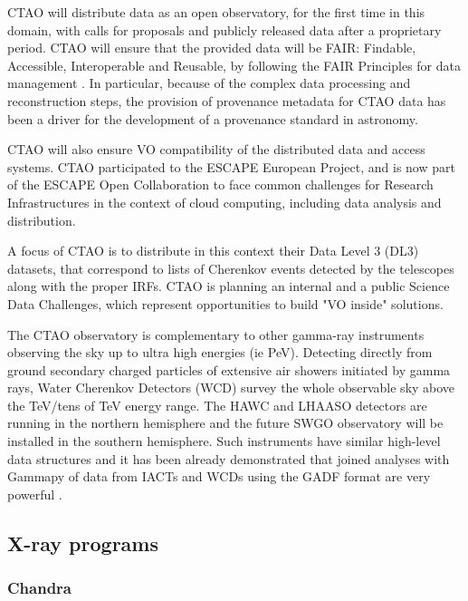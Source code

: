 \documentclass[11pt,a4paper]{ivoa}
\begin{document}
CTAO will distribute data as an open observatory, for the first time in this domain, with calls for proposals and
publicly released data after a proprietary period. CTAO will ensure that the provided data will be FAIR: Findable,
Accessible, Interoperable and Reusable, by following the FAIR Principles for data management \citep{Wilkinson2016}.
In particular, because of the complex data processing and reconstruction steps, the provision of provenance metadata
for CTAO data has been a driver for the development of a provenance standard in astronomy.

CTAO will also ensure VO compatibility of the distributed data and access systems. CTAO participated to the ESCAPE
European Project, and is now part of the ESCAPE Open Collaboration to face common challenges for Research Infrastructures
in the context of cloud computing, including data analysis and distribution.

A focus of CTAO is to distribute in this context their Data Level 3 (DL3) datasets, that correspond to lists of Cherenkov
events detected by the telescopes along with the proper IRFs. CTAO is planning an internal and a public Science Data
Challenges, which represent opportunities to build "VO inside" solutions.

The CTAO observatory is complementary to other gamma-ray instruments observing the sky up to ultra high energies (ie PeV).
Detecting directly from ground secondary charged particles of extensive air showers initiated by gamma rays, Water
Cherenkov Detectors (WCD) survey the whole observable sky above the TeV/tens of TeV energy range. The HAWC and LHAASO
detectors are running in the northern hemisphere and the future SWGO observatory will be installed in the southern
hemisphere. Such instruments have similar high-level data structures and it has been already demonstrated that joined
analyses with Gammapy of data from IACTs and WCDs using the GADF format are very powerful \citep{2022A&A...667A..36A}.

\subsection{X-ray programs}

\subsubsection{Chandra}\label{sec:chandra}
\end{document}
